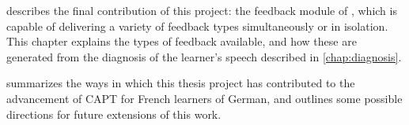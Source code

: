 describes the final contribution of this project: the feedback module of , which is capable of delivering a variety of feedback types simultaneously or in isolation. 
This chapter explains the types of feedback available, and how these are generated from the diagnosis of the learner's speech described in \cref{chap:diagnosis}.


 summarizes the ways in which this thesis project has contributed to the advancement of CAPT for French learners of German,
and
outlines some
possible directions for future extensions of this work.




%

